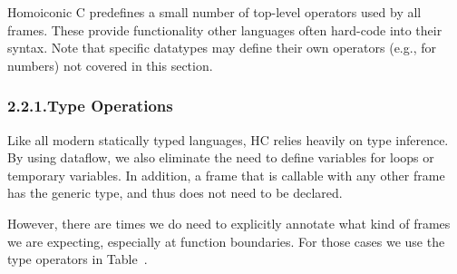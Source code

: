 \documentclass[preprint]{{acmart}}
\begin{document}
\noindent{}Homoiconic C predefines a small number of top-level operators used by all
frames. These provide functionality other languages often hard-code into
their syntax. Note that specific datatypes may define their own operators
(e.g., \mdcode{+} for numbers) not covered in this section.%

\subsubsection{2.2.1.\hspace*{0.5em}Type Operations}\label{sec-type-operations}%

\noindent{}Like all modern statically typed languages, HC relies heavily on type
inference. By using dataflow, we also eliminate the need to define
variables for loops or temporary variables. In addition, a frame that is
callable with any other frame has the generic type, and thus does not need to be
declared.%

However, there are times we do need to explicitly annotate what kind of
frames we are expecting, especially at function boundaries. For those
cases we use the type operators in Table~.%
\end{document}

